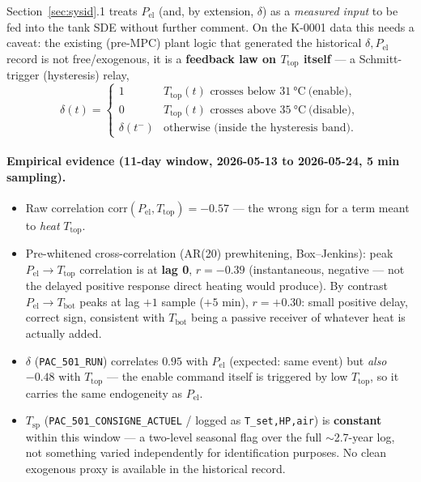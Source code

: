 \documentclass[11pt,a4paper]{article}
\newcommand{\Ttop}{T_{\mathrm{top}}}
\newcommand{\Tbot}{T_{\mathrm{bot}}}
\newcommand{\Tsp}{T_{\mathrm{sp}}} %
\newcommand{\Pel}{P_{\mathrm{el}}}
\newcommand{\code}[1]{\texttt{#1}}
\begin{document}
Section~\ref{sec:sysid}.1 treats $\Pel$ (and, by extension, $\delta$) as a
\emph{measured input} to be fed into the tank SDE without further comment. On
the K-0001 data this needs a caveat: the existing (pre-MPC) plant logic that
generated the historical $\delta,\Pel$ record is not free/exogenous, it is a
\textbf{feedback law on $\Ttop$ itself} --- a Schmitt-trigger (hysteresis)
relay,
\begin{equation}
  \delta(t) =
  \begin{cases}
    1 & \Ttop(t) \text{ crosses below } \SI{31}{\celsius}\ \text{(enable)},\\
    0 & \Ttop(t) \text{ crosses above } \SI{35}{\celsius}\ \text{(disable)},\\
    \delta(t^-) & \text{otherwise (inside the hysteresis band)}.
  \end{cases}
  \label{eq:enable-law}
\end{equation}

\paragraph{Empirical evidence (11-day window, 2026-05-13 to 2026-05-24, 5 min sampling).}
\begin{itemize}[nosep]
  \item Raw correlation $\mathrm{corr}(\Pel,\Ttop) = -0.57$ --- the wrong sign
        for a term meant to \emph{heat} $\Ttop$.
  \item Pre-whitened cross-correlation (AR(20) prewhitening, Box--Jenkins):
        peak $\Pel\!\to\!\Ttop$ correlation is at \textbf{lag 0}, $r=-0.39$
        (instantaneous, negative --- not the delayed positive response direct
        heating would produce). By contrast $\Pel\!\to\!\Tbot$ peaks at lag
        $+1$ sample ($+5$ min), $r=+0.30$: small positive delay, correct sign,
        consistent with $\Tbot$ being a passive receiver of whatever heat is
        actually added.
  \item $\delta$ (\code{PAC\_501\_RUN}) correlates $0.95$ with $\Pel$
        (expected: same event) but \emph{also} $-0.48$ with $\Ttop$ --- the
        enable command itself is triggered by low $\Ttop$, so it carries the
        same endogeneity as $\Pel$.
  \item $\Tsp$ (\code{PAC\_501\_CONSIGNE\_ACTUEL} / logged as
        \code{T\_set,HP,air}) is \textbf{constant} within this window --- a
        two-level seasonal flag over the full $\sim$2.7-year log, not
        something varied independently for identification purposes. No clean
        exogenous proxy is available in the historical record.
\end{itemize}
\end{document}
